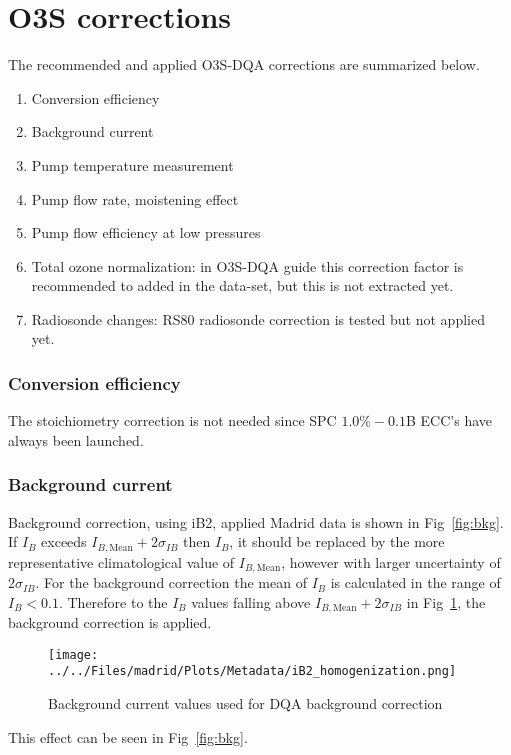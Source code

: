 \section{O3S corrections}
\label{sec:v04}


The recommended and applied O3S-DQA corrections are summarized below.
    \begin{enumerate}
        \item Conversion efficiency
        \item Background current
        \item Pump temperature measurement
        \item Pump flow rate, moistening effect
        \item Pump flow efficiency at low pressures
        \item Total ozone normalization: in O3S-DQA guide this correction factor is recommended to added in the data-set,
        but this is not extracted yet.
        \item Radiosonde changes: RS80 radiosonde correction is tested but not applied yet.
\end{enumerate}

    \subsubsection{Conversion efficiency}
 The stoichiometry correction is not needed since SPC $1.0\%-0.1$B ECC's have always been launched.



        \subsubsection{Background current}
        Background correction, using iB2, applied Madrid data is shown in Fig~\ref{fig:bkg}. If $I_B$ exceeds $I_{B,\text{Mean}}+2\sigma_{IB}$ then $I_B$, it
should be replaced by the more representative climatological value of $I_{B,\text{Mean}}$, however with
larger uncertainty of $2\sigma_{IB}$. For the background correction the mean of $I_B$ is calculated in the range of $I_B < 0.1$.
Therefore to the $I_B$ values falling above $I_{B,\text{Mean}}+2\sigma_{IB}$ in Fig~\ref{fig:bkg_hom}, the background correction is applied.

                \begin{figure}
        \centering
\texttt{[image: ../../Files/madrid/Plots/Metadata/iB2\_homogenization.png]}
    \caption{Background current values used for DQA background correction}
            \label{fig:bkg_hom}
    \end{figure}
This effect can be seen in  Fig~\ref{fig:bkg}.


